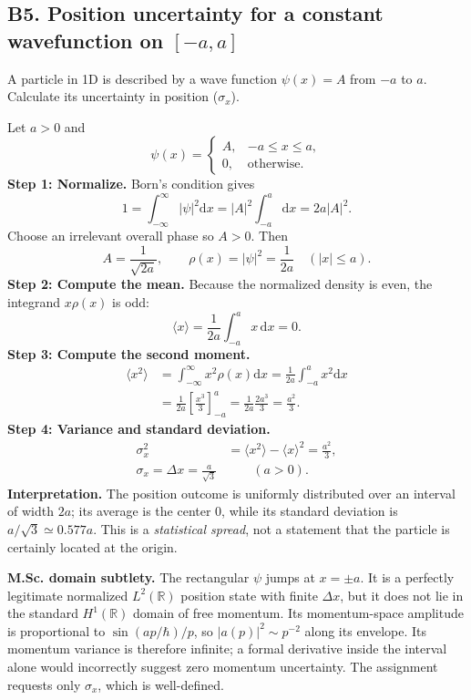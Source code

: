 \documentclass[11pt,a4paper]{article}
\newcommand{\dd}{\mathrm{d}}
\newcommand{\R}{\mathbb R}
\begin{document}
\subsection{B5. Position uncertainty for a constant wavefunction on $[-a,a]$}
\begin{questionbox}A particle in 1D is described by a wave function $\psi(x)=A$ from $-a$ to $a$. Calculate its uncertainty in position ($\sigma_x$).\end{questionbox}
Let $a>0$ and
\begin{equation}
\psi(x)=\begin{cases}A,&-a\le x\le a,\\0,&\text{otherwise.}\end{cases}
\end{equation}
\textbf{Step 1: Normalize.} Born's condition gives
\begin{equation}
1=\int_{-\infty}^{\infty}|\psi|^2\dd x
=|A|^2\int_{-a}^a\dd x=2a|A|^2.
\end{equation}
Choose an irrelevant overall phase so $A>0$. Then
\begin{equation}
\boxed{A=\frac1{\sqrt{2a}}},\qquad
\boxed{\rho(x)=|\psi|^2=\frac1{2a}\quad(|x|\le a)}.
\end{equation}
\textbf{Step 2: Compute the mean.} Because the normalized density is even, the integrand $x\rho(x)$ is odd:
\begin{equation}
\langle x\rangle=\frac1{2a}\int_{-a}^a x\,\dd x=\boxed{0}.
\end{equation}
\textbf{Step 3: Compute the second moment.}
\begin{align}
\langle x^2\rangle&=\int_{-\infty}^\infty x^2\rho(x)\dd x
=\frac1{2a}\int_{-a}^a x^2\dd x\\
&=\frac1{2a}\left[\frac{x^3}{3}\right]_{-a}^a
=\frac1{2a}\frac{2a^3}{3}=\boxed{\frac{a^2}{3}}.
\end{align}
\textbf{Step 4: Variance and standard deviation.}
\begin{align}
\sigma_x^2&=\langle x^2\rangle-\langle x\rangle^2=\frac{a^2}{3},\\
\boxed{\sigma_x=\Delta x=\frac{a}{\sqrt3}}&\qquad(a>0).
\end{align}
\textbf{Interpretation.} The position outcome is uniformly distributed over an interval of width $2a$; its average is the center $0$, while its standard deviation is $a/\sqrt3\simeq0.577a$. This is a \emph{statistical spread}, not a statement that the particle is certainly located at the origin.\par
\textbf{M.Sc. domain subtlety.} The rectangular $\psi$ jumps at $x=\pm a$. It is a perfectly legitimate normalized $L^2(\R)$ position state with finite $\Delta x$, but it does not lie in the standard $H^1(\R)$ domain of free momentum. Its momentum-space amplitude is proportional to $\sin(ap/\hbar)/p$, so $|a(p)|^2\sim p^{-2}$ along its envelope. Its momentum variance is therefore infinite; a formal derivative inside the interval alone would incorrectly suggest zero momentum uncertainty. The assignment requests only $\sigma_x$, which is well-defined.
\end{document}
